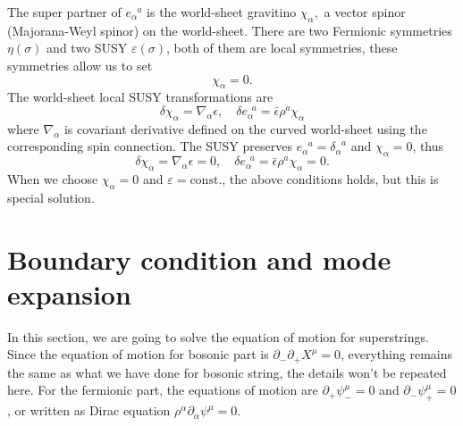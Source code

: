 \documentclass[graybox,envcountchap,sectrefs]{svmono}
\begin{document}
The super partner of $e_{\alpha}^{\,\,\,\,a}$ is the world-sheet gravitino 
$\chi_{\alpha},$ a vector spinor (Majorana-Weyl spinor) on the world-sheet. There are two Fermionic symmetries $\eta(\sigma)$ and two SUSY $\varepsilon(\sigma)$, both of them are local symmetries, these symmetries allow us to set 
\begin{equation}
\chi_{\alpha}=0.
\end{equation}
The world-sheet local SUSY transformations are
\begin{equation}
\delta \chi_{\alpha} =\nabla_{\alpha} \epsilon, \quad
\delta e_{\alpha}^{\,\,\,a} =\bar{\epsilon} \rho^{a} \chi_{\alpha}
\end{equation}
where $\nabla_{\alpha}$ is covariant derivative defined on the curved world-sheet using the corresponding spin connection.
The SUSY preserves $e_{\alpha}^{\,\,\,\,a}=\delta_{\alpha}^{\,\,\,\,a}$ and $\chi_{\alpha}=0$, thus
\begin{equation}
\delta \chi_{\alpha} =\nabla_{\alpha} \epsilon=0,\quad
\delta e_{\alpha}^{\,\,\,a} =\bar{\epsilon} \rho^{a} \chi_{\alpha}=0.
\end{equation}
When we choose $\chi_{\alpha}=0$ and $\varepsilon=\text{const}.$, the above conditions holds, but this is special solution.









\section{Boundary condition and mode expansion}

In this section, we are going to solve the equation of motion for superstrings. 
Since the equation of motion for bosonic part is $\partial_{-}\partial_{+}X^{\mu}=0$, everything remains the same as what we have done for bosonic string, the details won't be repeated here.
For the fermionic part, the equations of motion are $\partial_{+}\psi^{\mu}_{-}=0$ and $\partial_{-}\psi^{\mu}_{+}=0$, or written as Dirac equation $\rho^{\alpha}\partial_{\alpha}\psi^{\mu}=0$.
\end{document}
